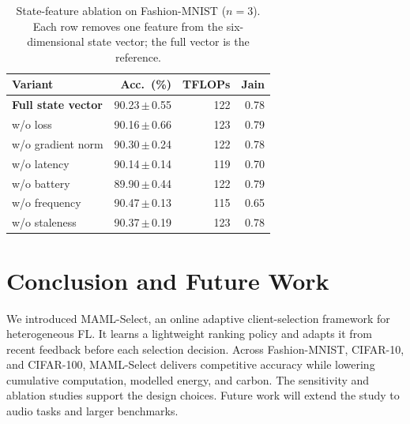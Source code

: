 \documentclass[journal]{IEEEtran}
\newcommand{\revision}[1]{#1}
\begin{document}
\begin{table}[H]
\vspace{1mm}
\centering
\caption{State-feature ablation on Fashion-MNIST ($n=3$). Each row removes one feature from the
six-dimensional state vector; the full vector is the reference.}
\label{tab:ablation}
\scriptsize
\setlength{\tabcolsep}{3.4pt}
\renewcommand{\arraystretch}{0.92}
\begin{tabular*}{\columnwidth}{@{\extracolsep{\fill}}lrrr@{}}
\toprule
Variant & Acc.\ (\%) & TFLOPs & Jain \\
\midrule
\textbf{Full state vector} & 90.23\,$\pm$\,0.55 & 122 & 0.78 \\
w/o loss & 90.16\,$\pm$\,0.66 & 123 & 0.79 \\
w/o gradient norm & 90.30\,$\pm$\,0.24 & 122 & 0.78 \\
w/o latency & 90.14\,$\pm$\,0.14 & 119 & 0.70 \\
w/o battery & 89.90\,$\pm$\,0.44 & 122 & 0.79 \\
w/o frequency & 90.47\,$\pm$\,0.13 & 115 & 0.65 \\
w/o staleness & 90.37\,$\pm$\,0.19 & 123 & 0.78 \\
\bottomrule
\end{tabular*}
\vspace{0mm}
\end{table}


\FloatBarrier
\section{Conclusion and Future Work}
\revision{We introduced MAML-Select, an online adaptive client-selection framework for heterogeneous FL. It learns a lightweight ranking policy and adapts it from recent feedback before each selection decision. Across Fashion-MNIST, CIFAR-10, and CIFAR-100, MAML-Select delivers competitive accuracy while lowering cumulative computation, modelled energy, and carbon. The sensitivity and ablation studies support the design choices. Future work will extend the study to audio tasks and larger benchmarks.}

\vspace{-1mm}
{\scriptsize


}
\end{document}
